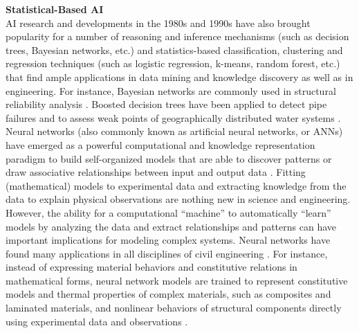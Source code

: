 \noindent\textbf{Statistical-Based AI} \\AI research and developments in the 1980s and 1990s have also brought popularity for a number of reasoning and inference mechanisms (such as decision trees, Bayesian networks, etc.) and statistics-based classification, clustering and regression techniques (such as logistic regression, k-means, random forest, etc.) that find ample applications in data mining and knowledge discovery as well as in engineering. For instance, Bayesian networks are commonly used in structural reliability analysis \citep{straub2010bayesian}. Boosted decision trees have been applied to detect pipe failures and to assess weak points of geographically distributed water systems \citep{winkler2018pipe,kumar2018using}. Neural networks (also commonly known as artificial neural networks, or ANNs) have emerged as a powerful computational and knowledge representation paradigm to build self-organized models that are able to discover patterns or draw associative relationships between input and output data \citep{bishop1995neural}. Fitting (mathematical) models to experimental data and extracting knowledge from the data to explain physical observations are nothing new in science and engineering. However, the ability for a computational ``machine'' to automatically ``learn'' models by analyzing the data and extract relationships and patterns can have important implications for modeling complex systems. Neural networks have found many applications in all disciplines of civil engineering \citep{garrettjr1996ai,kartam1997artificial}. For instance, instead of expressing material behaviors and constitutive relations in mathematical forms, neural network models are trained to represent constitutive models and thermal properties of complex materials, such as composites and laminated materials, and nonlinear behaviors of structural components directly using experimental data and observations \citep{ghaboussi1991knowledgebased, ghaboussi1998autoprogressive, aquino2006self}. 
\newline
 
